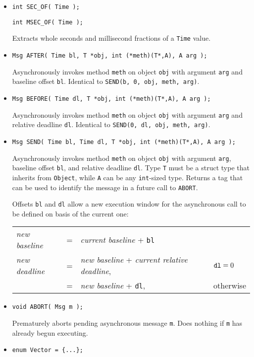 \documentclass[12pt]{article}
\begin{document}
\begin{itemize}
\item {\tt int SEC\_OF( Time );}

      {\tt int MSEC\_OF( Time );}
      
Extracts whole seconds and millisecond fractions of a {\tt Time} value.

\item {\tt Msg AFTER( Time bl, T *obj, int (*meth)(T*,A), A arg );}

Asynchronously invokes method {\tt meth} on object {\tt obj} with argument {\tt arg} and baseline offset {\tt bl}.  Identical to {\tt SEND(b, 0, obj, meth, arg)}.

\item {\tt Msg BEFORE( Time dl, T *obj, int (*meth)(T*,A), A arg );}

Asynchronously invokes method {\tt meth} on object {\tt obj} with argument {\tt arg} and relative deadline {\tt dl}.  Identical to {\tt SEND(0, dl, obj, meth, arg)}.

\item {\tt Msg SEND( Time bl, Time dl, T *obj, int (*meth)(T*,A), A arg );}

Asynchronously invokes method {\tt meth} on object {\tt obj} with argument {\tt arg}, baseline offset {\tt bl}, and relative deadline {\tt dl}.  Type {\tt T} must be a struct type that inherits from {\tt Object}, while {\tt A} can be any {\tt int}-sized type.  Returns a tag that can be used to identify the message in a future call to {\tt ABORT}.

Offsets {\tt bl} and {\tt dl} allow a new execution window for the asynchronous call to be defined on basis of the current one:
\begin{center}
\begin{tabular}{llll}
	{\em new baseline} & = & {\em current baseline} + {\tt bl} \\
         {\em new deadline} & = & {\em new baseline} + {\em current relative deadline},       & ${\tt dl} = 0$ \\
                                             & = & {\em new baseline} + {\tt dl}, & otherwise
\end{tabular}
\end{center}

\item {\tt void ABORT( Msg m );}

Prematurely aborts pending asynchronous message {\tt m}.  Does nothing if {\tt m} has already begun executing. 

\item {\tt enum Vector = \{...\};}


\end{itemize}
\end{document}
